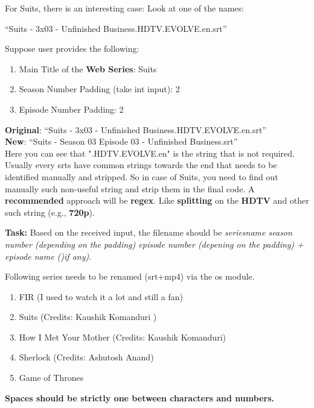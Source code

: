 \documentclass[12pt]{article}
\begin{document}
For Suits,  there is an interesting case:
Look at one of the names:

``Suits - 3x03 - Unfinished Business.HDTV.EVOLVE.en.srt''

Suppose user provides the following: 
\begin{enumerate}
	\item Main Title of the \textbf{Web Series}: Suits
	\item Season Number Padding (take int input): 2
	\item Episode Number Padding: 2
\end{enumerate}


\noindent
\textbf{Original}:
``Suits - 3x03 - Unfinished Business.HDTV.EVOLVE.en.srt'' \\
\textbf{New}:
``Suits - Season 03 Episode 03 - Unfinished Business.srt''\\

Here you can see that ".HDTV.EVOLVE.en" is the string that is not required. Usually every srts have common strings towards the end that needs to be identified manually and stripped. So in case of Suits,  you need to find out manually such non-useful string and strip them in the final code. A \textbf{recommended} approach will be \textbf{regex}. Like \textbf{splitting} on the \textbf{HDTV} and other such string (e.g., \textbf{720p}).

\textbf{Task:} Based on the received input,  the filename should be \textit{seriesname season number (depending on the padding) episode number (depening on the padding) + episode name ()if any)}.  


Following series needs to be renamed (srt+mp4) via the os module. 

\begin{enumerate}
	\item FIR (I used to watch it a lot and still a fan)
	\item Suits (Credits: Kaushik Komanduri )
	\item How I Met Your Mother  (Credits: Kaushik Komanduri)
\item 	Sherlock (Credits: Ashutosh Anand)
\item Game of Thrones
\end{enumerate}

\textbf{
	Spaces should be strictly one between characters and numbers.}
\end{document}
